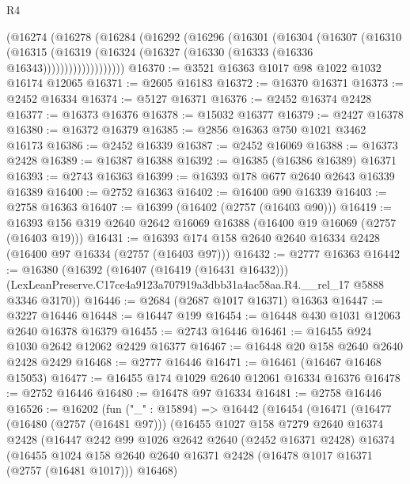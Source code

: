 \begin{lexlean}{R4}
\begin{coremodule}
          (@16274
            (@16278
              (@16284
                (@16292
                  (@16296
                    (@16301
                      (@16304
                        (@16307
                          (@16310
                            (@16315
                              (@16319
                                (@16324 (@16327 (@16330 (@16333 (@16336 @16343)))))))))))))))))))
@16370 := @3521 @16363 @1017 @98 @1022 @1032 @16174 @12065
@16371 := @2605 @16183
@16372 := @16370 @16371
@16373 := @2452 @16334
@16374 := @5127 @16371
@16376 := @2452 @16374 @2428
@16377 := @16373 @16376
@16378 := @15032 @16377
@16379 := @2427 @16378
@16380 := @16372 @16379
@16385 := @2856 @16363 @750 @1021 @3462 @16173
@16386 := @2452 @16339
@16387 := @2452 @16069
@16388 := @16373 @2428
@16389 := @16387 @16388
@16392 := @16385 (@16386 @16389) @16371
@16393 := @2743 @16363
@16399 := @16393 @178 @677 @2640 @2643 @16339 @16389
@16400 := @2752 @16363
@16402 := @16400 @90 @16339
@16403 := @2758 @16363
@16407 := @16399 (@16402 (@2757 (@16403 @90)))
@16419 := @16393 @156 @319 @2640 @2642 @16069 @16388 (@16400 @19 @16069 (@2757 (@16403 @19)))
@16431 := @16393 @174 @158 @2640 @2640 @16334 @2428 (@16400 @97 @16334 (@2757 (@16403 @97)))
@16432 := @2777 @16363
@16442 := @16380
    (@16392
      (@16407 (@16419 (@16431 @16432)))
      (LexLeanPreserve.C17ce4a9123a707919a3dbb31a4ac58aa.R4.__rel_17 @5888 @3346 @3170))
@16446 := @2684 (@2687 @1017 @16371) @16363
@16447 := @3227 @16446
@16448 := @16447 @199
@16454 := @16448 @430 @1031 @12063 @2640 @16378 @16379
@16455 := @2743 @16446
@16461 := @16455 @924 @1030 @2642 @12062 @2429 @16377
@16467 := @16448 @20 @158 @2640 @2640 @2428 @2429
@16468 := @2777 @16446
@16471 := @16461 (@16467 @16468 @15053)
@16477 := @16455 @174 @1029 @2640 @12061 @16334 @16376
@16478 := @2752 @16446
@16480 := @16478 @97 @16334
@16481 := @2758 @16446
@16526 := @16202
    (fun ("_" : @15894) =>
    @16442
      (@16454
        (@16471
          (@16477
            (@16480 (@2757 (@16481 @97)))
            (@16455
              @1027
              @158
              @7279
              @2640
              @16374
              @2428
              (@16447
                @242
                @99
                @1026
                @2642
                @2640
                (@2452 @16371 @2428)
                @16374
                (@16455
                  @1024
                  @158
                  @2640
                  @2640
                  @16371
                  @2428
                  (@16478 @1017 @16371 (@2757 (@16481 @1017)))
                  @16468)

\end{coremodule}
\end{lexlean}
